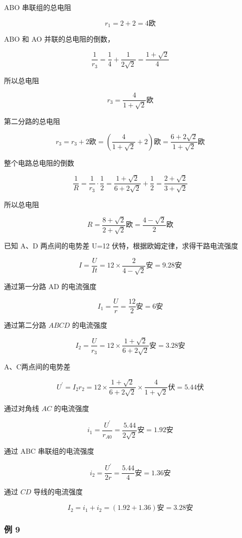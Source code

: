 ABO 串联组的总电阻

\[
r_{1} = 2 + 2 = 4 \text{欧}
\]

ABO 和 AO 并联的总电阻的倒数，

\[
\frac{1}{r_{3}} = \frac{1}{4} + \frac{1}{2 \sqrt{2}} = \frac{1 + \sqrt{2}}{4}
\]

所以总电阻

\[
r_{3} = \frac{4}{1 + \sqrt{2}} \text{欧}
\]

第二分路的总电阻

\[
r_{3} = r_{3} + 2 \text{欧} = \left(\frac{4}{1 + \sqrt{2}} + 2\right) \text{欧} = \frac{6 + 2 \sqrt{2}}{1 + \sqrt{2}} \text{欧}
\]

整个电路总电阻的倒数

\[
\frac{1}{R} = \frac{1}{r_{3}} \cdot \frac{1}{2} = \frac{1 + \sqrt{2}}{6 + 2 \sqrt{2}} + \frac{1}{2} = \frac{2 + \sqrt{2}}{3 + \sqrt{2}}
\]

所以总电阻

\[
R = \frac{8 + \sqrt{2}}{2 + \sqrt{2}} \text{欧} = \frac{4 - \sqrt{2}}{2} \text{欧}
\]

已知 A、D 两点间的电势差 U=12 伏特，根据欧姆定律，求得干路电流强度

\[
I = \frac{U}{I t} = 12 \times \frac{2}{4 - \sqrt{2}} \text{安} = 9.28 \text{安}
\]

通过第一分路 AD 的电流强度

\[
I_{1} = \frac{U}{r} = \frac{12}{2} \text{安} = 6 \text{安}
\]

通过第二分路 \(ABCD\) 的电流强度

\[
I_{2} = \frac{U}{r_{3}} = 12 \times \frac{1 + \sqrt{2}}{6 + 2 \sqrt{2}} \text{安} = 3.28 \text{安}
\]

A、C两点间的电势差

\[
U^{\prime} = I_{2} r_{2} = 12 \times \frac{1 + \sqrt{2}}{6 + 2 \sqrt{2}} \times \frac{4}{1 + \sqrt{2}} \text{伏} = 5.44 \text{伏}
\]

通过对角线 \(AC\) 的电流强度

\[
i_{1} = \frac{U^{\prime}}{r_{A 0}} = \frac{5.44}{2 \sqrt{2}} \text{安} = 1.92 \text{安}
\]

通过 ABC 串联组的电流强度

\[
i_{2} = \frac{U^{\prime}}{2 r} = \frac{5.44}{4} \text{安} = 1.36 \text{安}
\]

通过 \(CD\) 导线的电流强度

\[
I_{2} = i_{1} + i_{2} = (1.92 + 1.36) \text{安} = 3.28 \text{安}
\]

\subsubsection{例 9}\label{ux4f8b-9-1}

